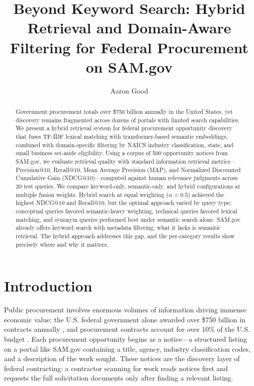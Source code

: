 \documentclass[10pt,twocolumn]{article}
\title{Beyond Keyword Search: Hybrid Retrieval and Domain-Aware Filtering for Federal Procurement on SAM.gov}
\author{Aaron Good}
\affiliation{Occidental College}
\begin{document}
\maketitle

\begin{abstract}
Government procurement totals over \$750 billion annually in the United States, yet discovery remains fragmented across dozens of portals with limited search capabilities. We present a hybrid retrieval system for federal procurement opportunity discovery that fuses TF-IDF lexical matching with transformer-based semantic embeddings, combined with domain-specific filtering by NAICS industry classification, state, and small business set-aside eligibility. Using a corpus of 500 opportunity notices from SAM.gov, we evaluate retrieval quality with standard information retrieval metrics---Precision@10, Recall@10, Mean Average Precision (MAP), and Normalized Discounted Cumulative Gain (NDCG@10)---computed against human relevance judgments across 20 test queries. We compare keyword-only, semantic-only, and hybrid configurations at multiple fusion weights. Hybrid search at equal weighting ($\alpha = 0.5$) achieved the highest NDCG@10 and Recall@10, but the optimal approach varied by query type: conceptual queries favored semantic-heavy weighting, technical queries favored lexical matching, and synonym queries performed best under semantic search alone. SAM.gov already offers keyword search with metadata filtering; what it lacks is semantic retrieval. The hybrid approach addresses this gap, and the per-category results show precisely where and why it matters.
\end{abstract}

\section{Introduction}

Public procurement involves enormous volumes of information driving immense economic value: the U.S. federal government alone awarded over \$750 billion in contracts annually \cite{HigherGov2022}, and procurement contracts account for over 10\% of the U.S. budget \cite{Omari2025}. Each procurement opportunity begins as a notice---a structured listing on a portal like SAM.gov containing a title, agency, industry classification codes, and a description of the work sought. These notices are the discovery layer of federal contracting: a contractor scanning for work reads notices first and requests the full solicitation documents only after finding a relevant listing.
\end{document}
